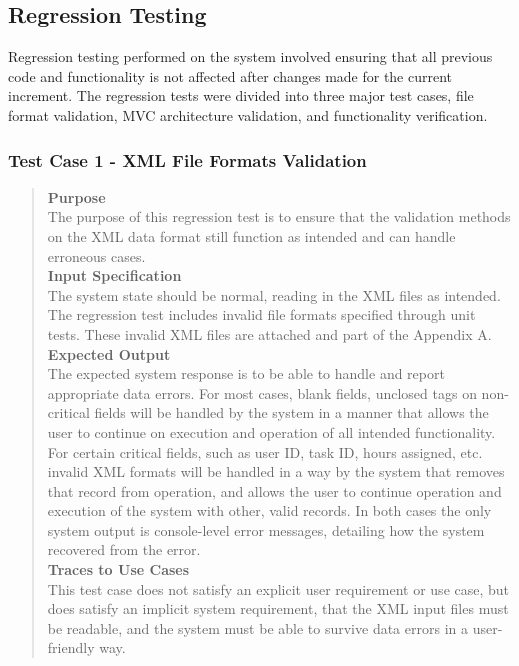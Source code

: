 \documentclass[12pt]{article}
\begin{document}
\subsection{Regression Testing}
{
Regression testing performed on the system involved ensuring that all previous code and functionality is not affected after changes made for the current increment. The regression tests were divided into three major test cases, file format validation, MVC architecture validation, and functionality verification.
}
\subsubsection{Test Case 1 - XML File Formats Validation}
\begin{quote}
{\bf Purpose}
\\
{
The purpose of this regression test is to ensure that the validation methods on the XML data format still function as intended and can handle erroneous cases.
}
\\
{\bf Input Specification}
\\
{
The system state should be normal, reading in the XML files as intended. The regression test includes invalid file formats specified through unit tests. These invalid XML files are attached and part of the Appendix A.
}
\\
{\bf Expected Output}
\\
{
The expected system response is to be able to handle and report appropriate data errors. For most cases, blank fields, unclosed tags on non-critical fields will be handled by the system in a manner that allows the user to continue on execution and operation of all intended functionality. For certain critical fields, such as user ID, task ID, hours assigned, etc. invalid XML formats will be handled in a way by the system that removes that record from operation, and allows the user to continue operation and execution of the system with other, valid records. In both cases the only system output is console-level error messages, detailing how the system recovered from the error.
}
\\
{\bf Traces to Use Cases}
\\
{
This test case does not satisfy an explicit user requirement or use case, but does satisfy an implicit system requirement, that the XML input files must be readable, and the system must be able to survive data errors in a user-friendly way.
}
\end{quote}
\end{document}
